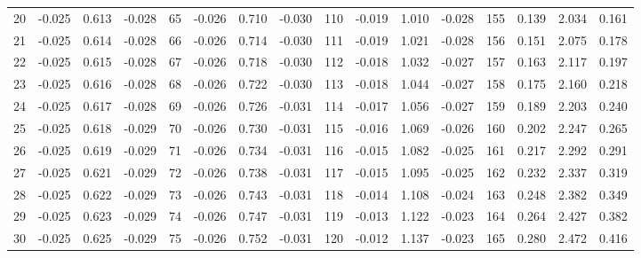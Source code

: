 \begin{table}
{\begin{tabular}{rrrr|rrrr|rrrr|crrr}
 20 & \tiny{ -0.025} &   0.613 & \tiny{ -0.028} &  65 & \tiny{ -0.026} &   0.710 & \tiny{ -0.030} & 110 & \tiny{ -0.019} &   1.010 & \tiny{ -0.028} & 155 & \tiny{  0.139} &   2.034 & \tiny{  0.161}\\
 21 & \tiny{ -0.025} &   0.614 & \tiny{ -0.028} &  66 & \tiny{ -0.026} &   0.714 & \tiny{ -0.030} & 111 & \tiny{ -0.019} &   1.021 & \tiny{ -0.028} & 156 & \tiny{  0.151} &   2.075 & \tiny{  0.178}\\
 22 & \tiny{ -0.025} &   0.615 & \tiny{ -0.028} &  67 & \tiny{ -0.026} &   0.718 & \tiny{ -0.030} & 112 & \tiny{ -0.018} &   1.032 & \tiny{ -0.027} & 157 & \tiny{  0.163} &   2.117 & \tiny{  0.197}\\
 23 & \tiny{ -0.025} &   0.616 & \tiny{ -0.028} &  68 & \tiny{ -0.026} &   0.722 & \tiny{ -0.030} & 113 & \tiny{ -0.018} &   1.044 & \tiny{ -0.027} & 158 & \tiny{  0.175} &   2.160 & \tiny{  0.218}\\
 24 & \tiny{ -0.025} &   0.617 & \tiny{ -0.028} &  69 & \tiny{ -0.026} &   0.726 & \tiny{ -0.031} & 114 & \tiny{ -0.017} &   1.056 & \tiny{ -0.027} & 159 & \tiny{  0.189} &   2.203 & \tiny{  0.240}\\
 25 & \tiny{ -0.025} &   0.618 & \tiny{ -0.029} &  70 & \tiny{ -0.026} &   0.730 & \tiny{ -0.031} & 115 & \tiny{ -0.016} &   1.069 & \tiny{ -0.026} & 160 & \tiny{  0.202} &   2.247 & \tiny{  0.265}\\
 26 & \tiny{ -0.025} &   0.619 & \tiny{ -0.029} &  71 & \tiny{ -0.026} &   0.734 & \tiny{ -0.031} & 116 & \tiny{ -0.015} &   1.082 & \tiny{ -0.025} & 161 & \tiny{  0.217} &   2.292 & \tiny{  0.291}\\
 27 & \tiny{ -0.025} &   0.621 & \tiny{ -0.029} &  72 & \tiny{ -0.026} &   0.738 & \tiny{ -0.031} & 117 & \tiny{ -0.015} &   1.095 & \tiny{ -0.025} & 162 & \tiny{  0.232} &   2.337 & \tiny{  0.319}\\
 28 & \tiny{ -0.025} &   0.622 & \tiny{ -0.029} &  73 & \tiny{ -0.026} &   0.743 & \tiny{ -0.031} & 118 & \tiny{ -0.014} &   1.108 & \tiny{ -0.024} & 163 & \tiny{  0.248} &   2.382 & \tiny{  0.349}\\
 29 & \tiny{ -0.025} &   0.623 & \tiny{ -0.029} &  74 & \tiny{ -0.026} &   0.747 & \tiny{ -0.031} & 119 & \tiny{ -0.013} &   1.122 & \tiny{ -0.023} & 164 & \tiny{  0.264} &   2.427 & \tiny{  0.382}\\
 30 & \tiny{ -0.025} &   0.625 & \tiny{ -0.029} &  75 & \tiny{ -0.026} &   0.752 & \tiny{ -0.031} & 120 & \tiny{ -0.012} &   1.137 & \tiny{ -0.023} & 165 & \tiny{  0.280} &   2.472 & \tiny{  0.416}\\

\end{tabular}}
\end{table}
